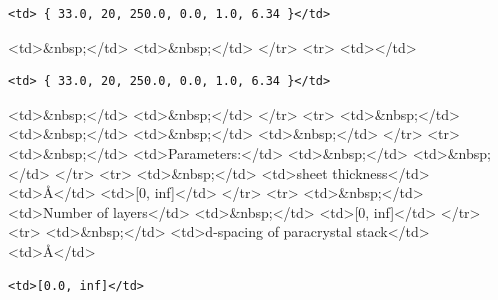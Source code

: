 \begin{verbatim}
<td> { 33.0, 20, 250.0, 0.0, 1.0, 6.34 }</td>
\end{verbatim}

\textless{}td\textgreater{}\&nbsp;\textless{}/td\textgreater{} \textless{}td\textgreater{}\&nbsp;\textless{}/td\textgreater{} \textless{}/tr\textgreater{} \textless{}tr\textgreater{} \textless{}td\textgreater{}\textless{}/td\textgreater{}

\begin{verbatim}
<td> { 33.0, 20, 250.0, 0.0, 1.0, 6.34 }</td>
\end{verbatim}

\textless{}td\textgreater{}\&nbsp;\textless{}/td\textgreater{} \textless{}td\textgreater{}\&nbsp;\textless{}/td\textgreater{} \textless{}/tr\textgreater{} \textless{}tr\textgreater{} \textless{}td\textgreater{}\&nbsp;\textless{}/td\textgreater{} \textless{}td\textgreater{}\&nbsp;\textless{}/td\textgreater{} \textless{}td\textgreater{}\&nbsp;\textless{}/td\textgreater{} \textless{}td\textgreater{}\&nbsp;\textless{}/td\textgreater{} \textless{}/tr\textgreater{} \textless{}tr\textgreater{} \textless{}td\textgreater{}\&nbsp;\textless{}/td\textgreater{} \textless{}td\textgreater{}Parameters:\textless{}/td\textgreater{} \textless{}td\textgreater{}\&nbsp;\textless{}/td\textgreater{} \textless{}td\textgreater{}\&nbsp;\textless{}/td\textgreater{} \textless{}/tr\textgreater{} \textless{}tr\textgreater{} \textless{}td\textgreater{}\&nbsp;\textless{}/td\textgreater{} \textless{}td\textgreater{}sheet thickness\textless{}/td\textgreater{} \textless{}td\textgreater{}\AA{}\textless{}/td\textgreater{} \textless{}td\textgreater{}[0, inf]\textless{}/td\textgreater{} \textless{}/tr\textgreater{} \textless{}tr\textgreater{} \textless{}td\textgreater{}\&nbsp;\textless{}/td\textgreater{} \textless{}td\textgreater{}Number of layers\textless{}/td\textgreater{} \textless{}td\textgreater{}\&nbsp;\textless{}/td\textgreater{} \textless{}td\textgreater{}[0, inf]\textless{}/td\textgreater{} \textless{}/tr\textgreater{} \textless{}tr\textgreater{} \textless{}td\textgreater{}\&nbsp;\textless{}/td\textgreater{} \textless{}td\textgreater{}d-spacing of paracrystal stack\textless{}/td\textgreater{} \textless{}td\textgreater{}\AA{}\textless{}/td\textgreater{}

\begin{verbatim}
<td>[0.0, inf]</td>
\end{verbatim}

